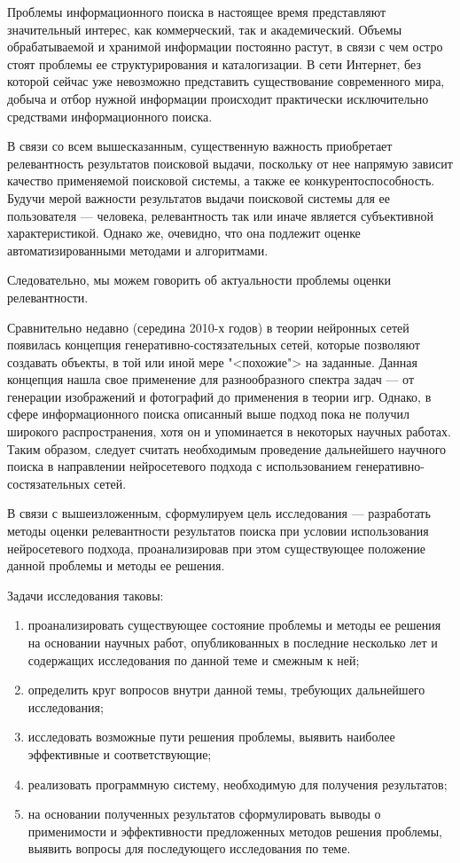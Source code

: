 Проблемы информационного поиска в настоящее время представляют значительный интерес, как коммерческий, так и академический. Объемы обрабатываемой
и хранимой информации постоянно растут, в связи с чем остро стоят проблемы ее структурирования и каталогизации. В сети Интернет, без которой сейчас
уже невозможно представить существование современного мира, добыча и отбор нужной информации происходит практически исключительно средствами 
информационного поиска. 

В связи со всем вышесказанным, существенную важность приобретает релевантность результатов поисковой выдачи, поскольку от нее напрямую зависит
качество применяемой поисковой системы, а также ее конкурентоспособность. Будучи мерой важности результатов выдачи поисковой системы для 
ее пользователя --- человека, релевантность так или иначе является субъективной характеристикой. Однако же, очевидно, что она подлежит оценке
автоматизированными методами и алгоритмами.

Следовательно, мы можем говорить об актуальности проблемы оценки релевантности.

Сравнительно недавно (середина 2010-х годов) в теории нейронных сетей появилась концепция генеративно-состязательных сетей, которые позволяют 
создавать объекты, в той или иной мере "<похожие"> на заданные. Данная концепция нашла свое применение для разнообразного спектра задач --- от 
генерации изображений и фотографий до применения в теории игр. Однако, в сфере информационного поиска описанный выше подход пока не получил
широкого распространения, хотя он и упоминается в некоторых научных работах. Таким образом, следует считать необходимым проведение
дальнейшего научного поиска в направлении нейросетевого подхода с использованием генеративно-состязательных сетей.


В связи с вышеизложенным, сформулируем цель исследования --- разработать методы оценки релевантности результатов поиска при 
условии использования нейросетевого подхода, проанализировав при этом существующее положение данной проблемы и методы ее решения.

Задачи исследования таковы:
\begin{enumerate}[1)]
    \item проанализировать существующее состояние проблемы и методы ее решения на основании научных работ, опубликованных
    в последние несколько лет и содержащих исследования по данной теме и смежным к ней;
    \item определить круг вопросов внутри данной темы, требующих дальнейшего исследования;
    \item исследовать возможные пути решения проблемы, выявить наиболее эффективные и соответствующие;
    \item реализовать программную систему, необходимую для получения результатов;
    \item на основании полученных результатов сформулировать выводы о применимости и эффективности предложенных
    методов решения проблемы, выявить вопросы для последующего исследования по теме.
\end{enumerate}

